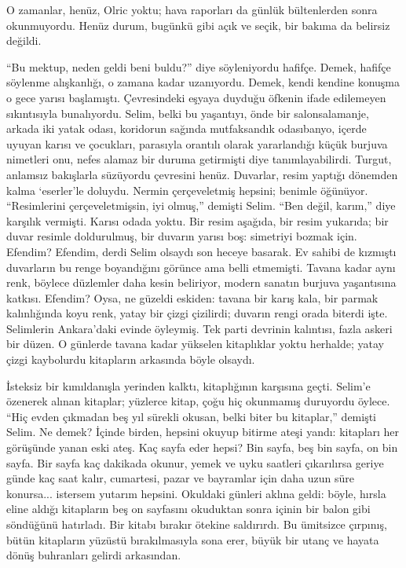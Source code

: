 \documentclass[a5paper,13pt]{scrbook}
\begin{document}
O zamanlar, henüz, Olric yoktu; hava raporları da günlük bültenlerden sonra
okunmuyordu. Henüz durum, bugünkü gibi açık ve seçik, bir bakıma da belirsiz
değildi.

``Bu mektup, neden geldi beni buldu?'' diye söyleniyordu hafifçe. Demek, hafifçe
söylenme alışkanlığı, o zamana kadar uzanıyordu. Demek, kendi kendine konuşma o
gece yarısı başlamıştı. Çevresindeki eşyaya duyduğu öfkenin ifade edilemeyen
sıkıntısıyla bunalıyordu. Selim, belki bu yaşantıyı, önde bir salonsalamanje,
arkada iki yatak odası, koridorun sağında mutfaksandık odasıbanyo, içerde uyuyan
karısı ve çocukları, parasıyla orantılı olarak yararlandığı küçük burjuva
nimetleri onu, nefes alamaz bir duruma getirmişti diye tanımlayabilirdi. Turgut,
anlamsız bakışlarla süzüyordu çevresini henüz. Duvarlar, resim yaptığı dönemden
kalma `eserler'le doluydu. Nermin çerçeveletmiş hepsini; benimle öğünüyor.
``Resimlerini çerçeveletmişsin, iyi olmuş,'' demişti Selim. ``Ben değil, karım,''
diye karşılık vermişti. Karısı odada yoktu. Bir resim aşağıda, bir resim
yukarıda; bir duvar resimle doldurulmuş, bir duvarın yarısı boş: simetriyi
bozmak için. Efendim? Efendim, derdi Selim olsaydı son heceye basarak. Ev sahibi
de kızmıştı duvarların bu renge boyandığını görünce ama belli etmemişti. Tavana
kadar aynı renk, böylece düzlemler daha kesin beliriyor, modern sanatın burjuva
yaşantısına katkısı. Efendim? Oysa, ne güzeldi eskiden: tavana bir karış kala,
bir parmak kalınlığında koyu renk, yatay bir çizgi çizilirdi; duvarın rengi
orada biterdi işte. Selimlerin Ankara'daki evinde öyleymiş. Tek parti devrinin
kalıntısı, fazla askeri bir düzen. O günlerde tavana kadar yükselen kitaplıklar
yoktu herhalde; yatay çizgi kaybolurdu kitapların arkasında böyle olsaydı.

İsteksiz bir kımıldanışla yerinden kalktı, kitaplığının karşısına geçti. Selim'e
özenerek alınan kitaplar; yüzlerce kitap, çoğu hiç okunmamış duruyordu öylece.
``Hiç evden çıkmadan beş yıl sürekli okusan, belki biter bu kitaplar,'' demişti
Selim. Ne demek? İçinde birden, hepsini okuyup bitirme ateşi yandı: kitapları
her görüşünde yanan eski ateş. Kaç sayfa eder hepsi? Bin sayfa, beş bin sayfa,
on bin sayfa. Bir sayfa kaç dakikada okunur, yemek ve uyku saatleri çıkarılırsa
geriye günde kaç saat kalır, cumartesi, pazar ve bayramlar için daha uzun süre
konursa... istersem yutarım hepsini. Okuldaki günleri aklına geldi: böyle,
hırsla eline aldığı kitapların beş on sayfasını okuduktan sonra içinin bir balon
gibi söndüğünü hatırladı. Bir kitabı bırakır ötekine saldırırdı. Bu ümitsizce
çırpınış, bütün kitapların yüzüstü bırakılmasıyla sona erer, büyük bir utanç ve
hayata dönüş buhranları gelirdi arkasından.
\end{document}
